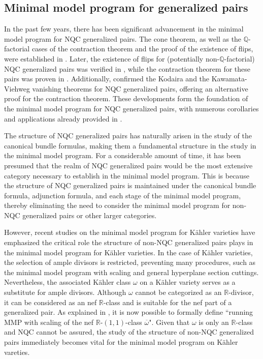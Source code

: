 \documentclass[11pt]{amsart}
\numberwithin{equation}{section}
\newcommand{\Rr}{\mathbb{R}}
\theoremstyle{definition}
\theoremstyle{definition}
\theoremstyle{definition}
\begin{document}
\subsection{Minimal model program for generalized pairs}\label{subsec: mmp gpair} In the past few years, there has been significant advancement in the minimal model program for NQC generalized pairs. The cone theorem, as well as the $\mathbb Q$-factorial cases of the contraction theorem and the proof of the existence of flips, were established in \cite{HL21a}. Later, the existence of flips for (potentially non-$\mathbb Q$-factorial) NQC generalized pairs was verified in \cite{LX23a}, while the contraction theorem for these pairs was proven in \cite{Xie22}. Additionally, \cite{CLX23} confirmed the Kodaira and the Kawamata-Viehweg vanishing theorems for NQC generalized pairs, offering an alternative proof for the contraction theorem. These developments form the foundation of the minimal model program for NQC generalized pairs, with numerous corollaries and applications already provided in \cite{LT22,TX23}.

The structure of NQC generalized pairs has naturally arisen in the study of the canonical bundle formulas, making them a fundamental structure in the study in the minimal model program. For a considerable amount of time, it has been presumed that the realm of NQC generalized pairs would be the most extensive category necessary to establish in the minimal model program. This is because the structure of NQC generalized pairs is maintained under the canonical bundle formula, adjunction formula, and each stage of the minimal model program, thereby eliminating the need to consider the minimal model program for non-NQC generalized pairs or other larger categories.

However, recent studies on the minimal model program for K\"ahler varieties \cite{DH23,DHY23} have emphasized the critical role the structure of non-NQC generalized pairs plays in the minimal model program for K\"ahler varieties. In the case of K\"ahler varieties, the selection of ample divisors is restricted, preventing many procedures, such as the minimal model program with scaling and general hyperplane section cuttings. Nevertheless, the associated K\"ahler class $\omega$ on a K\"ahler variety serves as a substitute for ample divisors. Although $\omega$ cannot be categorized as an $\Rr$-divisor, it can be considered as an nef $\Rr$-class and is suitable for the nef part of a generalized pair. As explained in \cite{DHY23}, it is now possible to formally define ``running MMP with scaling of the nef $\Rr$-$(1,1)$-class $\overline{\omega}$". Given that $\omega$ is only an $\Rr$-class and NQC cannot be assured, the study of the structure of non-NQC generalized pairs immediately becomes vital for the minimal model program on K\"ahler vareties.
\end{document}
